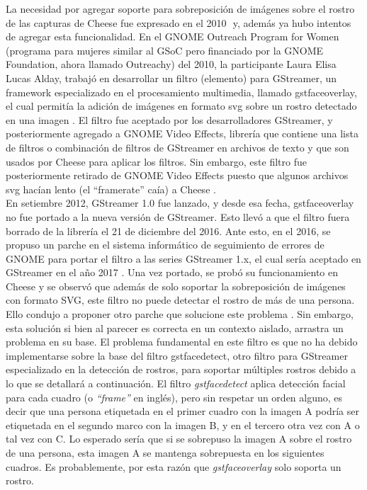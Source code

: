 \documentclass[a4paper,openright,12pt]{report}
\begin{document}
La necesidad por agregar soporte para sobreposición de imágenes sobre el rostro
de las capturas de Cheese fue expresado en el 2010 ⁠\cite{Bug6279256} y, además
ya hubo intentos de agregar esta funcionalidad. En el GNOME Outreach Program for
Women (programa para mujeres similar al GSoC pero financiado por la GNOME
Foundation, ahora llamado Outreachy) del 2010, la participante Laura Elisa Lucas
Alday, trabajó en desarrollar un filtro (elemento) para GStreamer, un framework
especializado en el procesamiento multimedia, llamado gstfaceoverlay, el cual
permitía la adición de imágenes en formato svg sobre un rostro detectado en una
imagen \cite{faceoverlay}\cite{gopw1}. El filtro fue aceptado por los
desarrolladores GStreamer, y posteriormente agregado a GNOME Video Effects,
librería que contiene una lista de filtros o combinación de filtros de GStreamer
en archivos de texto y que son usados por Cheese para aplicar los filtros. Sin
embargo, este filtro fue posteriormente retirado de GNOME Video Effects puesto
que algunos archivos svg hacían lento (el “framerate” caía) a Cheese
\cite{Bug6641489}.\\


En setiembre 2012, GStreamer 1.0 fue lanzado, y desde esa fecha, gstfaceoverlay
no fue portado a la nueva versión de GStreamer. Esto llevó a que el filtro fuera
borrado de la librería el 21 de diciembre del 2016. Ante esto, en el 2016, se
propuso un parche en el sistema informático de seguimiento de errores de GNOME
para portar el filtro a las
series GStreamer 1.x, el cual sería aceptado en GStreamer en el año 2017
\cite{Bug7640127}. Una vez portado, se probó su funcionamiento en Cheese
\cite{CFOCHfunnyStickersCheese} y se observó que además de solo soportar la
sobreposición de imágenes con formato SVG, este filtro no puede detectar el
rostro de más de una persona. Ello condujo a proponer otro parche que solucione
este problema \cite{Bug7691771}. Sin embargo, esta solución si bien al parecer
es correcta en un contexto aislado, arrastra un problema en su base. El problema
fundamental en este filtro es que no ha debido implementarse sobre la base del
filtro \gls{gstfacedetect}, otro filtro para GStreamer especializado en la detección
de rostros, para soportar múltiples rostros debido a lo que se detallará a
continuación. El filtro \textit{\gls{gstfacedetect}} aplica detección facial para
cada cuadro (o \textit{``frame''} en inglés), pero sin respetar un orden alguno,
es decir que una persona etiquetada en el primer cuadro con la imagen A podría
ser etiquetada en el segundo marco con la imagen B, y en el tercero otra vez
con A o tal vez con C. Lo esperado sería que si se sobrepuso la imagen A sobre
el rostro de una persona, esta imagen A se mantenga sobrepuesta en los
siguientes cuadros. Es probablemente, por esta razón que \textit{gstfaceoverlay}
solo soporta un rostro.\\
\end{document}
